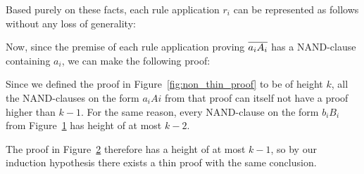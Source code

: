 Based purely on these facts, each rule application $r_i$ can be represented as follows without any loss of generality:\par
\begin{figure}[!h]
  \centering
  \begin{prooftree*}
    \Hypo{\dots}
    \Hypo{\dots}
    \Hypo{\dots}
    \Hypo{\dots}
    \Hypo{\dots}
    \Hypo{\dots}
  \end{prooftree*}
  \caption{}
  \label{fig:proof_aiAi}
\end{figure}
Now, since the premise of each rule application proving $\ol{a_iA_i}$ has a NAND-clause containing $a_i$, we can make the following proof:\par
\begin{figure}[!h]
  \centering
  \begin{prooftree*}
    \Hypo{\dots}
    \Hypo{\dots}
    \Hypo{\dots}
    \Hypo{\dots}
    \Hypo{\dots}
  \end{prooftree*}
  \caption{}
  \label{fig:proof_biBi}
\end{figure}
\FloatBarrier
Since we defined the proof in Figure~\ref{fig:non_thin_proof} to be of height $k$, all the NAND-clauses on the form $a_iAi$ from that proof can itself not have a proof higher than $k-1$.
For the same reason, every NAND-clause on the form $b_iB_i$ from Figure~\ref{fig:proof_aiAi} has height of at most $k-2$.

The proof in Figure~\ref{fig:proof_biBi} therefore has a height of at most $k-1$, so by our induction hypothesis there exists a thin proof with the same conclusion.
